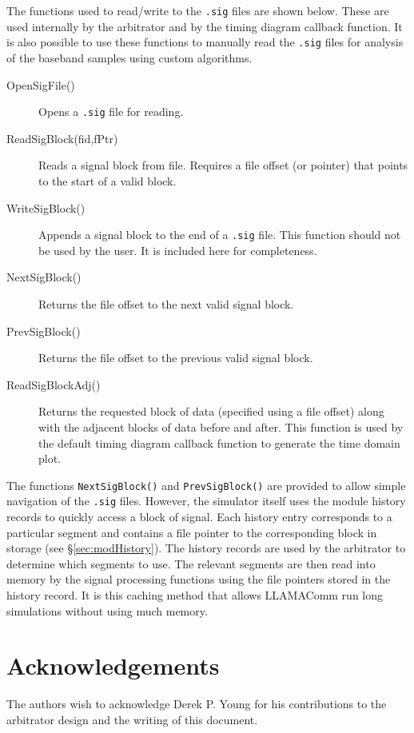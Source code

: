 The functions used to read/write to the \verb+.sig+ files are shown
below.  These are used internally by the arbitrator and by the
timing diagram callback function. It is also possible to use these
functions to manually read the \verb+.sig+ files for analysis of the
baseband samples using custom algorithms.

\begin{description}
\item[OpenSigFile()] Opens a \verb+.sig+ file for reading.

\item[ReadSigBlock(fid,fPtr)] Reads a signal block from file.
Requires a file offset (or pointer) that points to the start of a
valid block.

\item[WriteSigBlock()] Appends a signal block to the end of a
\verb+.sig+ file.  This function should not be used by the user.  It
is included here for completeness.

\item[NextSigBlock()] Returns the file offset to the next valid
signal block.

\item[PrevSigBlock()] Returns the file offset to the previous valid
signal block.

\item[ReadSigBlockAdj()] Returns the requested block of data
(specified using a file offset) along with the adjacent blocks of
data before and after.  This function is used by the default timing
diagram callback function to generate the time domain plot.
\end{description}

The functions \verb+NextSigBlock()+ and \verb+PrevSigBlock()+ are
provided to allow simple navigation of the \verb+.sig+ files.
However, the simulator itself uses the module history records to
quickly access a block of signal.  Each history entry corresponds to
a particular segment and contains a file pointer to the
corresponding block in storage (see \S\ref{sec:modHistory}). The
history records are used by the arbitrator to determine which
segments to use. The relevant segments are then read into memory by
the signal processing functions using the file pointers stored in
the history record.  It is this caching method that allows LLAMAComm
run long simulations without using much memory.

\section{Acknowledgements}
The authors wish to acknowledge Derek P. Young for his contributions to the arbitrator design and the writing of this document.

